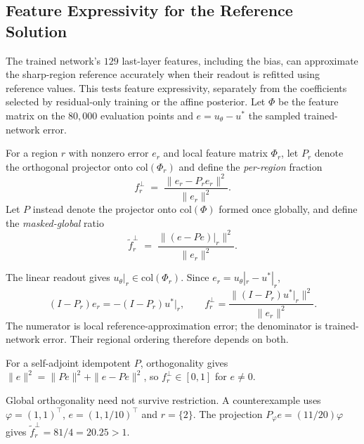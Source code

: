 \subsection{Feature Expressivity for the Reference Solution}\label{sec:offmanifold}

The trained network's $129$ last-layer features, including the bias, can approximate
the sharp-region reference accurately when their readout is refitted using reference
values. This tests feature expressivity, separately from the coefficients selected by
residual-only training or the affine posterior. Let $\Phi$ be the feature matrix on the $80{,}000$ evaluation points
and $e=u_\theta-u^\ast$ the sampled trained-network error.

\begin{samepage}
\begin{definition}\label{def:diagnostics}
For a region $r$ with nonzero error $e_r$ and local feature matrix $\Phi_r$, let $P_r$ denote the
orthogonal projector onto $\mathrm{col}(\Phi_r)$ and define the \emph{per-region} fraction
\begin{equation}\label{eq:fperregion}
  f^{\perp}_r \;=\; \frac{\|e_r - P_r e_r\|^2}{\|e_r\|^2}.
\end{equation}
Let $P$ instead denote the projector onto $\mathrm{col}(\Phi)$ formed once globally, and define
the \emph{masked-global} ratio
\begin{equation*}
  \tilde f^{\perp}_r \;=\; \frac{\big\|(e - Pe)\big|_r\big\|^2}{\|e_r\|^2}.
\end{equation*}
\end{definition}
\end{samepage}

The linear readout gives
$u_\theta|_r\in\mathrm{col}(\Phi_r)$. Since $e_r=u_\theta|_r-u^\ast|_r$,
\[
 (I-P_r)e_r=-(I-P_r)u^\ast|_r,
 \qquad
 f_r^\perp=\frac{\|(I-P_r)u^\ast|_r\|^2}{\|e_r\|^2}.
\]
The numerator is local reference-approximation error; the denominator is trained-network
error. Their regional ordering therefore depends on both.

\begin{remark}\label{prop:wellposed}
For a self-adjoint idempotent $P$, orthogonality gives
$\|e\|^2=\|Pe\|^2+\|e-Pe\|^2$, so $f_r^\perp\in[0,1]$ for $e\ne0$.
\end{remark}

\begin{remark}\label{prop:illposed}
Global orthogonality need not survive restriction. A counterexample uses
$\varphi=(1,1)^\top$,
$e=(1,1/10)^\top$ and $r=\{2\}$. The projection $P_\varphi e=(11/20)\varphi$
gives $\tilde f_r^\perp=81/4=20.25>1$.
\end{remark}

